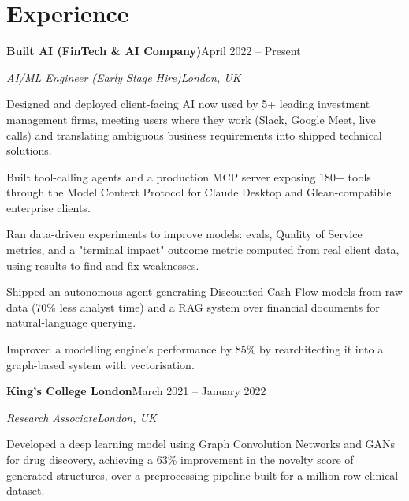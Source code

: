 \documentclass[10pt,a4paper]{article}
\newcommand{\entry}[4]{%
  {\color{company}\bfseries #1}\hfill {\color{muted}#2}\par
  \vspace{1pt}
  {\itshape #3}\hfill {\color{muted}\itshape #4}\par
  \vspace{3pt}%
}
\begin{document}
\section{Experience}
\entry{Built AI (FinTech \& AI Company)}{April 2022 -- Present}{AI/ML Engineer (Early Stage Hire)}{London, UK}
\begin{tight}
  \item Designed and deployed client-facing AI now used by 5+ leading investment management firms, meeting users where they work (Slack, Google Meet, live calls) and translating ambiguous business requirements into shipped technical solutions.
  \item Built tool-calling agents and a production MCP server exposing 180+ tools through the Model Context Protocol for Claude Desktop and Glean-compatible enterprise clients.
  \item Ran data-driven experiments to improve models: evals, Quality of Service metrics, and a "terminal impact" outcome metric computed from real client data, using results to find and fix weaknesses.
  \item Shipped an autonomous agent generating Discounted Cash Flow models from raw data (70\% less analyst time) and a RAG system over financial documents for natural-language querying.
  \item Improved a modelling engine's performance by 85\% by rearchitecting it into a graph-based system with vectorisation.
\end{tight}

\entry{King's College London}{March 2021 -- January 2022}{Research Associate}{London, UK}
\begin{tight}
  \item Developed a deep learning model using Graph Convolution Networks and GANs for drug discovery, achieving a 63\% improvement in the novelty score of generated structures, over a preprocessing pipeline built for a million-row clinical dataset.
\end{tight}

\end{document}

